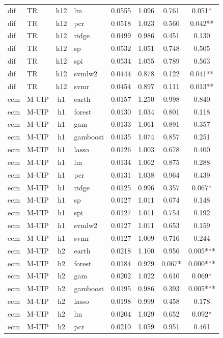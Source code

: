 \begin{ThreePartTable}
\begin{longtable}[t]{llclcccc}
dif & TR & h12 & lm & 0.0555 & 1.096 & 0.761 & 0.051*\\
dif & TR & h12 & pcr & 0.0518 & 1.023 & 0.560 & 0.042**\\
dif & TR & h12 & ridge & 0.0499 & 0.986 & 0.451 & 0.130\\
dif & TR & h12 & sp & 0.0532 & 1.051 & 0.748 & 0.505\\
dif & TR & h12 & spi & 0.0534 & 1.055 & 0.789 & 0.563\\
dif & TR & h12 & svmlw2 & 0.0444 & 0.878 & 0.122 & 0.041**\\
dif & TR & h12 & svmr & 0.0454 & 0.897 & 0.111 & 0.013**\\
\addlinespace
ecm & M-UIP & h1 & earth & 0.0157 & 1.250 & 0.998 & 0.840\\
ecm & M-UIP & h1 & forest & 0.0130 & 1.034 & 0.801 & 0.118\\
ecm & M-UIP & h1 & gam & 0.0133 & 1.061 & 0.891 & 0.357\\
ecm & M-UIP & h1 & gamboost & 0.0135 & 1.074 & 0.857 & 0.251\\
ecm & M-UIP & h1 & lasso & 0.0126 & 1.003 & 0.678 & 0.400\\
ecm & M-UIP & h1 & lm & 0.0134 & 1.062 & 0.875 & 0.288\\
ecm & M-UIP & h1 & pcr & 0.0131 & 1.038 & 0.964 & 0.439\\
ecm & M-UIP & h1 & ridge & 0.0125 & 0.996 & 0.357 & 0.067*\\
ecm & M-UIP & h1 & sp & 0.0127 & 1.011 & 0.674 & 0.148\\
ecm & M-UIP & h1 & spi & 0.0127 & 1.011 & 0.754 & 0.192\\
ecm & M-UIP & h1 & svmlw2 & 0.0127 & 1.011 & 0.653 & 0.159\\
ecm & M-UIP & h1 & svmr & 0.0127 & 1.009 & 0.716 & 0.244\\
\addlinespace
ecm & M-UIP & h2 & earth & 0.0218 & 1.100 & 0.956 & 0.005***\\
ecm & M-UIP & h2 & forest & 0.0184 & 0.929 & 0.067* & 0.000***\\
ecm & M-UIP & h2 & gam & 0.0202 & 1.022 & 0.610 & 0.069*\\
ecm & M-UIP & h2 & gamboost & 0.0195 & 0.986 & 0.393 & 0.005***\\
ecm & M-UIP & h2 & lasso & 0.0198 & 0.999 & 0.458 & 0.178\\
ecm & M-UIP & h2 & lm & 0.0204 & 1.029 & 0.652 & 0.092*\\
ecm & M-UIP & h2 & pcr & 0.0210 & 1.059 & 0.951 & 0.461\\

\end{longtable}
\end{ThreePartTable}

